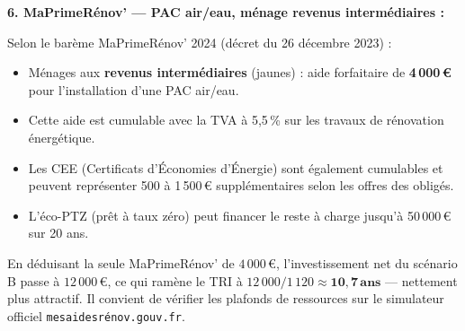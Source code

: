 \medskip
\textbf{6. MaPrimeRénov' — PAC air/eau, ménage revenus intermédiaires :}

Selon le barème MaPrimeRénov' 2024 (décret du 26 décembre 2023) :
\begin{itemize}
  \item Ménages aux \textbf{revenus intermédiaires} (jaunes) : aide forfaitaire de \textbf{4\,000\,€} pour l'installation d'une PAC air/eau.
  \item Cette aide est cumulable avec la TVA à 5,5\,\% sur les travaux de rénovation énergétique.
  \item Les CEE (Certificats d'Économies d'Énergie) sont également cumulables et peuvent représenter 500 à 1\,500\,€ supplémentaires selon les offres des obligés.
  \item L'éco-PTZ (prêt à taux zéro) peut financer le reste à charge jusqu'à 50\,000\,€ sur 20 ans.
\end{itemize}

\begin{methode}
En déduisant la seule MaPrimeRénov' de $4\,000\,€$, l'investissement net du scénario B passe à $12\,000\,€$, ce qui ramène le TRI à $12\,000 / 1\,120 \approx \mathbf{10{,}7\,\text{ans}}$ — nettement plus attractif. Il convient de vérifier les plafonds de ressources sur le simulateur officiel \texttt{mesaidesrénov.gouv.fr}.
\end{methode}
